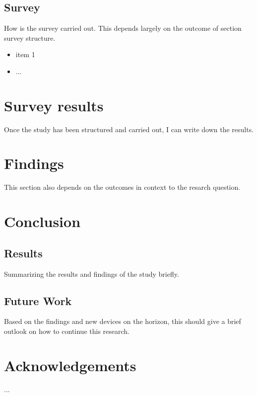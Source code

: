         \section{Survey}

            How is the survey carried out. This depends largely on the outcome of section survey structure.

            \begin{itemize}
                \item item 1
                \item ...
            \end{itemize}

    \chapter{Survey results}

        Once the study has been structured and carried out, I can write down the results.

    \chapter{Findings}

        This section also depends on the outcomes in context to the resarch question.

    \chapter{Conclusion}

        \section{Results}

            Summarizing the results and findings of the study briefly.

        \section{Future Work}

            Based on the findings and new devices on the horizon, this should give a brief outlook on how to continue this research.

    \chapter{Acknowledgements}

        ...

